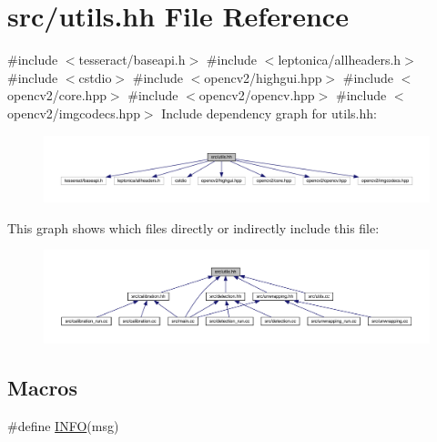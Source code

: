 \hypertarget{utils_8hh}{}\section{src/utils.hh File Reference}
\label{utils_8hh}
{\ttfamily \#include $<$tesseract/baseapi.\+h$>$}\newline
{\ttfamily \#include $<$leptonica/allheaders.\+h$>$}\newline
{\ttfamily \#include $<$cstdio$>$}\newline
{\ttfamily \#include $<$opencv2/highgui.\+hpp$>$}\newline
{\ttfamily \#include $<$opencv2/core.\+hpp$>$}\newline
{\ttfamily \#include $<$opencv2/opencv.\+hpp$>$}\newline
{\ttfamily \#include $<$opencv2/imgcodecs.\+hpp$>$}\newline
Include dependency graph for utils.\+hh\+:
\nopagebreak
\begin{figure}[H]
\begin{center}
\leavevmode
\includegraphics[width=350pt]{utils_8hh__incl}
\end{center}
\end{figure}
This graph shows which files directly or indirectly include this file\+:
\nopagebreak
\begin{figure}[H]
\begin{center}
\leavevmode
\includegraphics[width=350pt]{utils_8hh__dep__incl}
\end{center}
\end{figure}
\subsection*{Macros}
\begin{DoxyCompactItemize}
\item 
\#define \mbox{\hyperlink{utils_8hh_a3ae64706314066fdc8b6c8029a915aa7}{I\+N\+FO}}(msg)
\end{DoxyCompactItemize}
